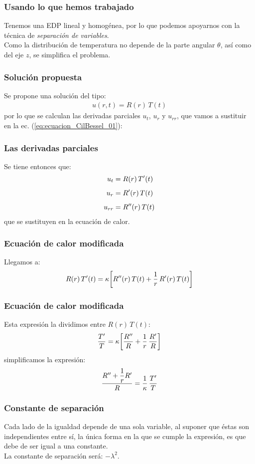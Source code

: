 \documentclass[12pt]{beamer}
\begin{document}
\begin{frame}
\frametitle{Usando lo que hemos trabajado}
Tenemos una EDP lineal y homogénea, por lo que podemos apoyarnos con la técnica de \emph{separación de variables}.
\\
\bigskip
\pause
Como la distribución de temperatura no depende  de la parte angular $\theta$, así como del eje $z$, se simplifica el problema.
\end{frame}
\begin{frame}
\frametitle{Solución propuesta}
Se propone una solución del tipo:
\pause
\begin{align*}
u(r, t) = R(r) \, T(t)
\end{align*}
\pause
por lo que se calculan las derivadas parciales $u_{t}$, $u_{r}$ y $u_{rr}$, que vamos a sustituir en la ec. (\ref{eq:ecuacion_CilBessel_01}):
\end{frame}
\begin{frame}
\frametitle{Las derivadas parciales}
Se tiene entonces que:
\pause
\begin{align*}
u_{t} &= R(r) \, {T}^{\prime}(t) \\[0.5em]
u_{r} &= {R}^{\prime}(r) \, {T}(t) \\[0.5em]
u_{rr} &= {R}^{\prime \prime}(r) \, {T}(t)
\end{align*}
que se sustituyen en la ecuación de calor.
\end{frame}
\begin{frame}
\frametitle{Ecuación de calor modificada}
Llegamos a:
\pause
\begin{align*}
R(r) \, {T}^{\prime}(t) = \kappa \bigg[ {R}^{\prime \prime}(r) \, {T}(t) + \dfrac{1}{r} \, {R}^{\prime}(r) \, {T}(t) \bigg]
\end{align*}
\end{frame}
\begin{frame}
\frametitle{Ecuación de calor modificada}
Esta expresión la dividimos entre $R(r) \, T(t)$:
\pause
\begin{align*}
\dfrac{{T}^{\prime}}{T} = \kappa \bigg[ \dfrac{{R}^{\prime \prime}}{R} + \dfrac{1}{r} \, \dfrac{{R}^{\prime}}{R} \bigg]
\end{align*}
\pause
simplificamos la expresión:
\pause
\begin{align*}
\dfrac{{R}^{\prime \prime} + \dfrac{1}{r} {R}^{\prime}}{R} = \dfrac{1}{\kappa} \, \dfrac{{T}^{\prime}}{T}
\end{align*}
\end{frame}
\begin{frame}
\frametitle{Constante de separación}
Cada lado de la igualdad depende de una sola variable, al suponer que éstas son independientes entre sí, la única forma en la que se cumple la expresión, es que debe de ser igual a una constante.
\pause
\\
\bigskip
La constante de separación será: $-\lambda^{2}$.
\end{frame}
\end{document}

